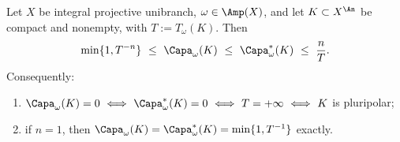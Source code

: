 \begin{proposition}
\label{prop:ch48-at-compact}
Let $X$ be integral projective unibranch, $\omega\in\Amp(X)$, and let
$K\subset X^{\An}$ be compact and nonempty, with
$T:=T_\omega(K)$.  Then
\[
 \min\{1,T^{-n}\}\ \le\ \Capa_\omega(K)\ \le\ \Capa^*_\omega(K)
 \ \le\ \frac nT .
\]
Consequently:
\begin{enumerate}
\item\label{itm:ch48-atc:zero}
      $\Capa_\omega(K)=0\ \Longleftrightarrow\ \Capa^*_\omega(K)=0
      \ \Longleftrightarrow\ T=+\infty
      \ \Longleftrightarrow\ K$ is pluripolar;
\item\label{itm:ch48-atc:curve}
      if $n=1$, then
      $\Capa_\omega(K)=\Capa^*_\omega(K)=\min\{1,T^{-1}\}$ exactly.
\end{enumerate}
\end{proposition}

